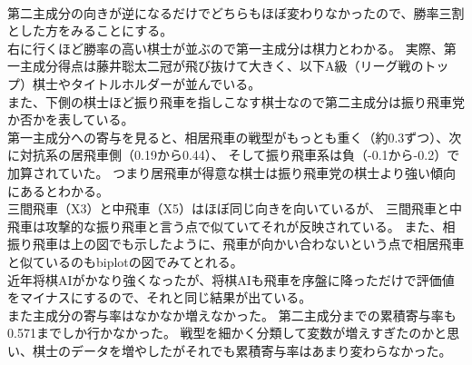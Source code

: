 \documentclass[11pt,a4paper,dvipdfmx]{jsarticle}
\begin{document}
\\
第二主成分の向きが逆になるだけでどちらもほぼ変わりなかったので、勝率三割とした方をみることにする。
\\
右に行くほど勝率の高い棋士が並ぶので第一主成分は棋力とわかる。
実際、第一主成分得点は藤井聡太二冠が飛び抜けて大きく、以下A級（リーグ戦のトップ）棋士やタイトルホルダーが並んでいる。
\\
また、下側の棋士ほど振り飛車を指しこなす棋士なので第二主成分は振り飛車党か否かを表している。
\\
第一主成分への寄与を見ると、相居飛車の戦型がもっとも重く（約0.3ずつ）、次に対抗系の居飛車側（0.19から0.44）、
そして振り飛車系は負（-0.1から-0.2）で加算されていた。
つまり居飛車が得意な棋士は振り飛車党の棋士より強い傾向にあるとわかる。
\\
三間飛車（X3）と中飛車（X5）はほぼ同じ向きを向いているが、
三間飛車と中飛車は攻撃的な振り飛車と言う点で似ていてそれが反映されている。
また、相振り飛車は上の図でも示したように、飛車が向かい合わないという点で相居飛車と似ているのもbiplotの図でみてとれる。
\\
近年将棋AIがかなり強くなったが、将棋AIも飛車を序盤に降っただけで評価値をマイナスにするので、それと同じ結果が出ている。
\\
また主成分の寄与率はなかなか増えなかった。
第二主成分までの累積寄与率も0.571までしか行かなかった。
戦型を細かく分類して変数が増えすぎたのかと思い、棋士のデータを増やしたがそれでも累積寄与率はあまり変わらなかった。
\end{document}
